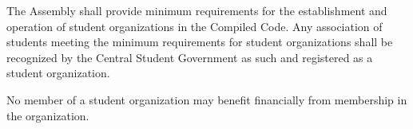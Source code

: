    The Assembly shall provide minimum requirements for the establishment and operation of student organizations in the Compiled Code. Any association of students meeting the minimum requirements for student organizations shall be recognized by the Central Student Government as such and registered as a student organization.

   No member of a student organization may benefit financially from membership in the organization.
